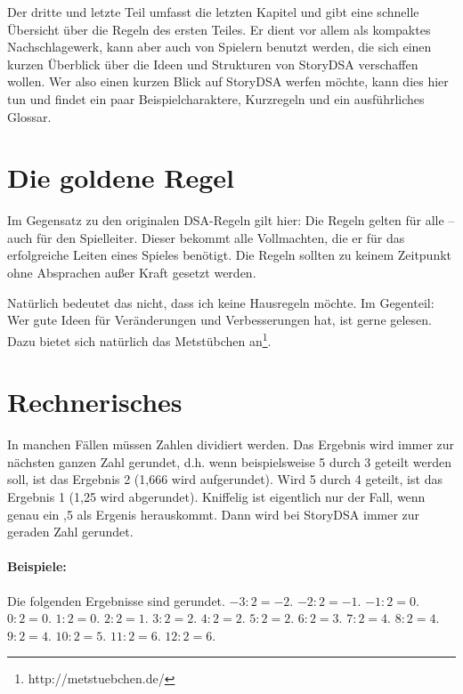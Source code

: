 Der dritte und letzte Teil umfasst die letzten Kapitel und gibt eine schnelle Übersicht über die Regeln des ersten Teiles. Er dient vor allem als kompaktes Nachschlagewerk, kann aber auch von Spielern benutzt werden, die sich einen kurzen Überblick über die Ideen und Strukturen von StoryDSA verschaffen wollen. Wer also einen kurzen Blick auf StoryDSA werfen möchte, kann dies hier tun und findet ein paar Beispielcharaktere, Kurzregeln und ein ausführliches Glossar.


\section{Die goldene Regel}
Im Gegensatz zu den originalen DSA-Regeln gilt hier: Die Regeln gelten für alle -- auch für den Spielleiter. Dieser bekommt alle Vollmachten, die er für das erfolgreiche Leiten eines Spieles benötigt.  Die Regeln sollten zu keinem Zeitpunkt ohne Absprachen außer Kraft gesetzt werden.

Natürlich bedeutet das nicht, dass ich keine Hausregeln möchte. Im Gegenteil: Wer gute Ideen für Veränderungen und Verbesserungen hat, ist gerne gelesen. Dazu bietet sich natürlich das Metstübchen an\footnote{http://metstuebchen.de/}.

\section{Rechnerisches}
In manchen Fällen müssen Zahlen dividiert werden. Das Ergebnis wird immer zur nächsten ganzen Zahl gerundet, d.h. wenn beispielsweise 5 durch 3 geteilt werden soll, ist das Ergebnis 2 (1,666 wird aufgerundet). Wird 5 durch 4 geteilt, ist das Ergebnis 1 (1,25 wird abgerundet). Kniffelig ist eigentlich nur der Fall, wenn genau ein ,5 als Ergenis herauskommt. Dann wird bei StoryDSA immer zur geraden Zahl gerundet.

\begin{beispiel}
\paragraph{Beispiele:} Die folgenden Ergebnisse sind gerundet. $-3:2=-2$. $-2:2=-1$. $-1:2=0$. $0:2=0$. $1:2=0$. $2:2=1$. $3:2=2$. $4:2=2$. $5:2=2$. $6:2=3$. $7:2=4$. $8:2=4$. $9:2=4$. $10:2=5$. $11:2=6$. $12:2=6$.
\end{beispiel}
